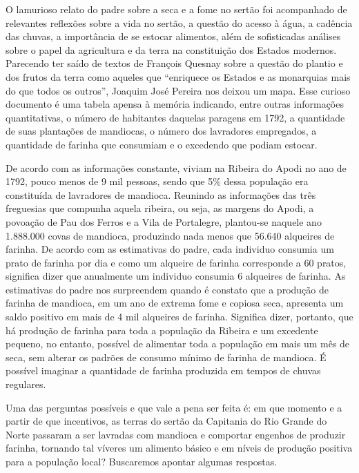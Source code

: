 \begin{refsection}
O lamurioso relato do padre sobre a seca e a fome no sertão foi acompanhado de relevantes reflexões sobre a vida no sertão, a questão do acesso à água, a cadência das chuvas, a importância de se estocar alimentos, além de sofisticadas análises sobre o papel da agricultura e da terra na constituição dos Estados modernos. Parecendo ter saído de textos de François Quesnay sobre a questão do plantio e dos frutos da terra como aqueles que “enriquece os Estados e as monarquias mais do que todos os outros”, Joaquim José Pereira nos deixou um mapa. Esse curioso documento é uma tabela apensa à memória indicando, entre outras informações quantitativas, o número de habitantes daquelas paragens em 1792, a quantidade de suas plantações de mandiocas, o número dos lavradores empregados, a quantidade de farinha que consumiam e o excedendo que podiam estocar. 

De acordo com as informações constante, viviam na Ribeira do Apodi no ano de 1792, pouco menos de 9 mil pessoas, sendo que 5\% dessa população era constituída de lavradores de mandioca. Reunindo as informações das três freguesias que compunha aquela ribeira, ou seja, as margens do Apodi, a povoação de Pau dos Ferros e a Vila de Portalegre, plantou-se naquele ano 1.888.000 covas de mandioca, produzindo nada menos que 56.640 alqueires de farinha. De acordo com as estimativas do padre, cada individuo consumia um prato de farinha por dia e como um alqueire de farinha corresponde a 60 pratos, significa dizer que anualmente um individuo consumia 6 alqueires de farinha. As estimativas do padre nos surpreendem quando é constato que a produção de farinha de mandioca, em um ano de extrema fome e copiosa seca, apresenta um saldo positivo em mais de 4 mil alqueires de farinha. Significa dizer, portanto, que há produção de farinha para toda a população da Ribeira e um excedente pequeno, no entanto, possível de alimentar toda a população em mais um mês de seca, sem alterar os padrões de consumo mínimo de farinha de mandioca. É possível imaginar a quantidade de farinha produzida em tempos de chuvas regulares.  

Uma das perguntas possíveis e que vale a pena ser feita é: em que momento e a partir de que incentivos, as terras do sertão da Capitania do Rio Grande do Norte passaram a ser lavradas com mandioca e comportar engenhos de produzir farinha, tornando tal víveres um alimento básico e em níveis de produção positiva para a população local? Buscaremos apontar algumas respostas. 


\end{refsection}
